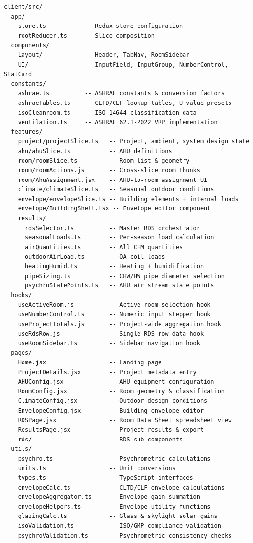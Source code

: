 \documentclass[12pt, a4paper, oneside]{report}
\begin{document}
\begin{lstlisting}[language={}, caption={Source Directory Layout}]
client/src/
  app/
    store.ts           -- Redux store configuration
    rootReducer.ts     -- Slice composition
  components/
    Layout/            -- Header, TabNav, RoomSidebar
    UI/                -- InputField, InputGroup, NumberControl, StatCard
  constants/
    ashrae.ts          -- ASHRAE constants & conversion factors
    ashraeTables.ts    -- CLTD/CLF lookup tables, U-value presets
    isoCleanroom.ts    -- ISO 14644 classification data
    ventilation.ts     -- ASHRAE 62.1-2022 VRP implementation
  features/
    project/projectSlice.ts   -- Project, ambient, system design state
    ahu/ahuSlice.ts           -- AHU definitions
    room/roomSlice.ts         -- Room list & geometry
    room/roomActions.js       -- Cross-slice room thunks
    room/AhuAssignment.jsx    -- AHU-to-room assignment UI
    climate/climateSlice.ts   -- Seasonal outdoor conditions
    envelope/envelopeSlice.ts -- Building elements + internal loads
    envelope/BuildingShell.tsx -- Envelope editor component
    results/
      rdsSelector.ts          -- Master RDS orchestrator
      seasonalLoads.ts        -- Per-season load calculation
      airQuantities.ts        -- All CFM quantities
      outdoorAirLoad.ts       -- OA coil loads
      heatingHumid.ts         -- Heating + humidification
      pipeSizing.ts           -- CHW/HW pipe diameter selection
      psychroStatePoints.ts   -- AHU air stream state points
  hooks/
    useActiveRoom.js          -- Active room selection hook
    useNumberControl.ts       -- Numeric input stepper hook
    useProjectTotals.js       -- Project-wide aggregation hook
    useRdsRow.js              -- Single RDS row data hook
    useRoomSidebar.ts         -- Sidebar navigation hook
  pages/
    Home.jsx                  -- Landing page
    ProjectDetails.jsx        -- Project metadata entry
    AHUConfig.jsx             -- AHU equipment configuration
    RoomConfig.jsx            -- Room geometry & classification
    ClimateConfig.jsx         -- Outdoor design conditions
    EnvelopeConfig.jsx        -- Building envelope editor
    RDSPage.jsx               -- Room Data Sheet spreadsheet view
    ResultsPage.jsx           -- Project results & export
    rds/                      -- RDS sub-components
  utils/
    psychro.ts                -- Psychrometric calculations
    units.ts                  -- Unit conversions
    types.ts                  -- TypeScript interfaces
    envelopeCalc.ts           -- CLTD/CLF envelope calculations
    envelopeAggregator.ts     -- Envelope gain summation
    envelopeHelpers.ts        -- Envelope utility functions
    glazingCalc.ts            -- Glass & skylight solar gains
    isoValidation.ts          -- ISO/GMP compliance validation
    psychroValidation.ts      -- Psychrometric consistency checks
\end{lstlisting}
\end{document}
